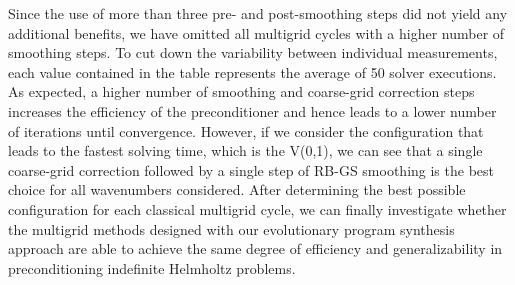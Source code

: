 Since the use of more than three pre- and post-smoothing steps did not yield any additional benefits, we have omitted all multigrid cycles with a higher number of smoothing steps.
To cut down the variability between individual measurements, each value contained in the table represents the average of 50 solver executions.
As expected, a higher number of smoothing and coarse-grid correction steps increases the efficiency of the preconditioner and hence leads to a lower number of iterations until convergence.
However, if we consider the configuration that leads to the fastest solving time, which is the V(0,1), we can see that a single coarse-grid correction followed by a single step of RB-GS smoothing is the best choice for all wavenumbers considered.
After determining the best possible configuration for each classical multigrid cycle, we can finally investigate whether the multigrid methods designed with our evolutionary program synthesis approach are able to achieve the same degree of efficiency and generalizability in preconditioning indefinite Helmholtz problems.

